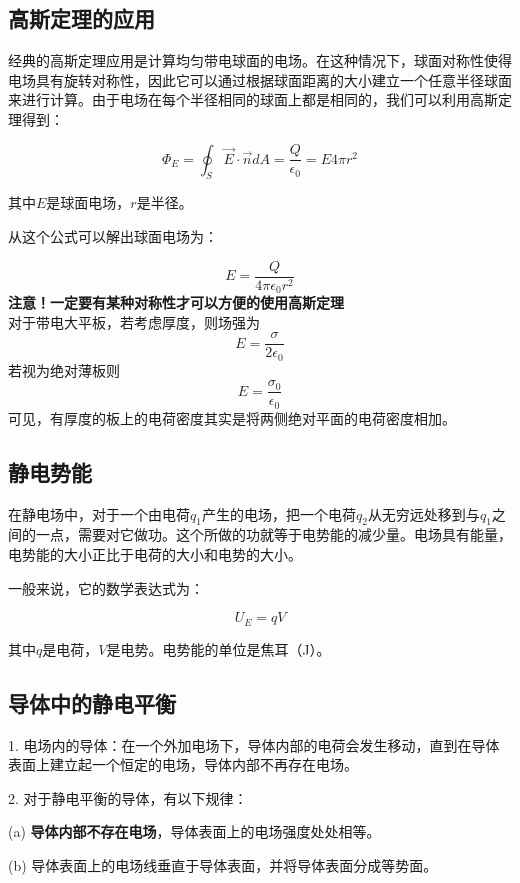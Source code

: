 \subsection{高斯定理的应用}
经典的高斯定理应用是计算均匀带电球面的电场。在这种情况下，球面对称性使得电场具有旋转对称性，因此它可以通过根据球面距离的大小建立一个任意半径球面来进行计算。由于电场在每个半径相同的球面上都是相同的，我们可以利用高斯定理得到：

$$ \Phi_E = \oint_S \vec{E}\cdot\vec{n}dA = \frac{Q}{\epsilon_0} = E4\pi r^2 $$

其中$E$是球面电场，$r$是半径。

从这个公式可以解出球面电场为：

$$ E = \frac{Q}{4\pi\epsilon_0 r^2} $$
\textbf{注意！一定要有某种对称性才可以方便的使用高斯定理}\\
对于带电大平板，若考虑厚度，则场强为
\begin{equation}\label{key}
	E=\dfrac{\sigma}{2\epsilon_0}
\end{equation}
若视为绝对薄板则
\begin{equation}\label{key}
	E=\dfrac{\sigma_0}{\epsilon_0}
\end{equation}
可见，有厚度的板上的电荷密度其实是将两侧绝对平面的电荷密度相加。
\subsection{静电势能}

在静电场中，对于一个由电荷$q_1$产生的电场，把一个电荷$q_2$从无穷远处移到与$q_1$之间的一点，需要对它做功。这个所做的功就等于电势能的减少量。电场具有能量，电势能的大小正比于电荷的大小和电势的大小。

一般来说，它的数学表达式为：

$$ U_E = qV $$

其中$q$是电荷，$V$是电势。电势能的单位是焦耳（J）。

\subsection{导体中的静电平衡}
1. 电场内的导体：在一个外加电场下，导体内部的电荷会发生移动，直到在导体表面上建立起一个恒定的电场，导体内部不再存在电场。

2. 对于静电平衡的导体，有以下规律：

(a) \textbf{导体内部不存在电场}，导体表面上的电场强度处处相等。

(b) 导体表面上的电场线垂直于导体表面，并将导体表面分成等势面。


